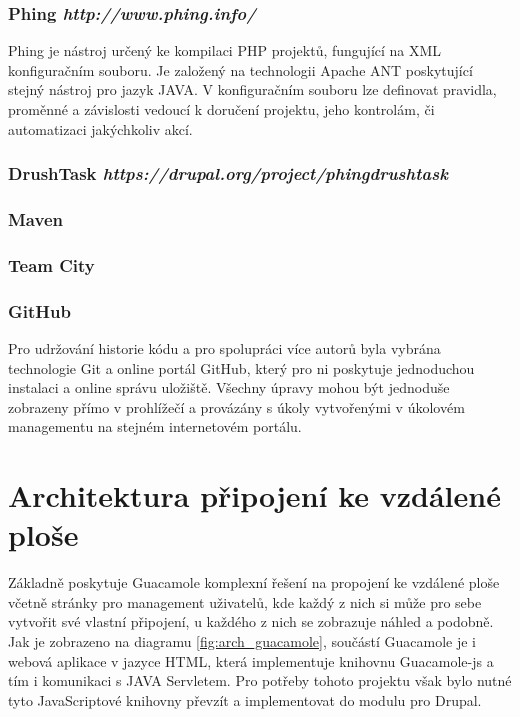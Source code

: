 \subsubsection*{Phing \hfill \emph{http://www.phing.info/}}
Phing je nástroj určený ke kompilaci PHP projektů, fungující na XML konfiguračním souboru. Je založený na technologii Apache ANT poskytující stejný nástroj pro jazyk JAVA. V konfiguračním souboru lze definovat pravidla, proměnné a závislosti vedoucí k doručení projektu, jeho kontrolám, či automatizaci jakýchkoliv akcí. 

\subsubsection*{DrushTask \hfill \emph{https://drupal.org/project/phingdrushtask}}

\subsubsection*{Maven}

\subsubsection*{Team City}

\subsubsection*{GitHub}
Pro udržování historie kódu a pro spolupráci více autorů byla vybrána technologie Git a online portál GitHub, který pro ni poskytuje jednoduchou instalaci a online správu uložiště. Všechny úpravy mohou být jednoduše zobrazeny přímo v prohlížečí a provázány s úkoly vytvořenými v úkolovém managementu na stejném internetovém portálu. 

\section{Architektura připojení ke vzdálené ploše}
Základně poskytuje Guacamole komplexní řešení na propojení ke vzdálené ploše včetně stránky pro management uživatelů, kde každý z nich si může pro sebe vytvořit své vlastní připojení, u každého z nich se zobrazuje náhled a podobně. Jak je zobrazeno na diagramu \ref{fig:arch_guacamole}, součástí Guacamole je i webová aplikace v jazyce HTML, která implementuje knihovnu Guacamole-js a tím i komunikaci s JAVA Servletem. Pro potřeby tohoto projektu však bylo nutné tyto JavaScriptové knihovny převzít a implementovat do modulu pro Drupal. 

